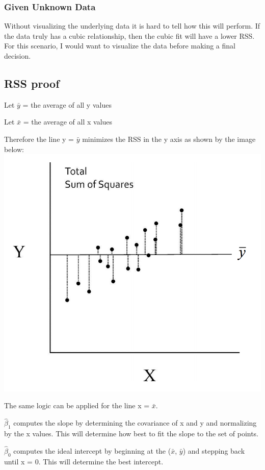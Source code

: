 \documentclass[11pt]{article}
\makeatletter
\def\maxwidth{\ifdim\Gin@nat@width>\linewidth\linewidth
    \else\Gin@nat@width\fi}
\let\Oldincludegraphics\includegraphics
\renewcommand{\includegraphics}[1]{\Oldincludegraphics[width=.8\maxwidth]{#1}}
\makeatother
\begin{document}
    \subsubsection{Given Unknown Data}\label{given-unknown-data}

Without visualizing the underlying data it is hard to tell how this will
perform. If the data truly has a cubic relationship, then the cubic fit
will have a lower RSS. For this scenario, I would want to visualize the
data before making a final decision.

    \subsection{RSS proof}\label{rss-proof}

    Let \(\bar{y}\) = the average of all y values

Let \(\bar{x}\) = the average of all x values

Therefore the line y = \(\bar{y}\) minimizes the RSS in the y axis as
shown by the image below: \includegraphics{rssY}

The same logic can be applied for the line x = \(\bar{x}\).

\(\hat{\beta}_1\) computes the slope by determining the covariance of x
and y and normalizing by the x values. This will determine
how best to fit the slope to the set of points.

\(\hat{\beta}_0\) computes the ideal intercept by beginning at the
(\(\bar{x}\), \(\bar{y}\)) and stepping back until x = 0. This will
determine the best intercept.
\end{document}
